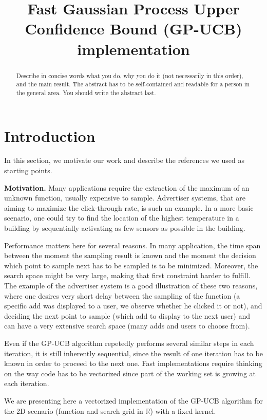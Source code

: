 \documentclass[letterpaper]{article}
\title{Fast Gaussian Process Upper Confidence Bound (GP-UCB) implementation}
\newcommand{\mypar}[1]{{\bf #1.}}
\begin{document}
%
\maketitle
%

\begin{abstract}
Describe in concise words what you do, why you do it (not necessarily
in this order), and the main result.  The abstract has to be
self-contained and readable for a person in the general area. You
should write the abstract last.
\end{abstract}

\section{Introduction}\label{sec:intro}

In this section, we motivate our work and describe the references we used as starting points.

\mypar{Motivation} Many applications require the extraction of the maximum of an unknown function, usually expensive to sample. Advertiser systems, that are aiming to maximize the click-through rate, is such an example. In a more basic scenario, one could try to find the location of the highest temperature in a building by sequentially activating as few sensors as possible in the building.

Performance matters here for several reasons. In many application, the time span between the moment the sampling result is known and the moment the decision which point to sample next has to be sampled is to be minimized. Moreover, the search space might be very large, making that first constraint harder to fulfill. The example of the advertiser system is a good illustration of these two reasons, where one desires very short delay between the sampling of the function (a specific add was displayed to a user, we observe whether he clicked it or not), and deciding the next point to sample (which add to display to the next user) and can have a very extensive search space (many adds and users to choose from).

Even if the GP-UCB algorithm repetedly performs several similar steps in each iteration, it is still inherently sequential, since the result of one iteration has to be known in order to proceed to the next one. Fast implementations require thinking on the way code has to be vectorized since part of the working set is growing at each iteration.

We are presenting here a vectorized implementation of the GP-UCB algorithm for the 2D scenario (function and search grid in $\mathbb{R}$) with a fixed kernel.
\end{document}

